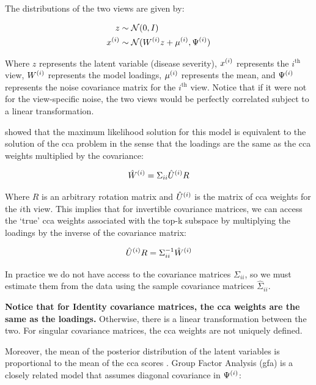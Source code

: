 The distributions of the two views are given by:

\begin{align}
    z& \sim \mathcal{N}(0, I)\\
    x^{(i)} & \sim \mathcal{N}(W^{(i)} z + \mu^{(i)}, \Psi^{(i)})
\end{align}

Where \(z\) represents the latent variable (disease severity), \(x^{(i)}\) represents the $i^{\text{th}}$ view, \(W^{(i)}\) represents the model loadings, \(\mu^{(i)}\) represents the mean, and \(\Psi^{(i)}\) represents the noise covariance matrix for the $i^{\text{th}}$ view.
Notice that if it were not for the view-specific noise, the two views would be perfectly correlated subject to a linear transformation.

\citet{bach2005probabilistic} showed that the maximum likelihood solution for this model is equivalent to the solution of the \acrshort{cca} problem in the sense that the \gls{loadings} are the same as the \acrshort{cca} weights multiplied by the covariance:

\begin{align}
    \label{eq:probabilistic-cca}
    \hat{W}^{(i)} = \Sigma_{ii} \hat{U}^{(i)} R
\end{align}

Where $R$ is an arbitrary rotation matrix and $\hat{U}^{(i)}$ is the matrix of \acrshort{cca} weights for the $i$th view.
This implies that for invertible covariance matrices, we can access the `true' \acrshort{cca} weights associated with the top-k subspace by multiplying the \gls{loadings} by the inverse of the covariance matrix:

\begin{align}
    \hat{U}^{(i)}R = \Sigma_{ii}^{-1} \hat{W}^{(i)}
\end{align}

In practice we do not have access to the covariance matrices $\Sigma_{ii}$, so we must estimate them from the data using the sample covariance matrices $\hat{\Sigma}_{ii}$.

\textbf{Notice that for Identity covariance matrices, the \acrshort{cca} weights are the same as the loadings.}
Otherwise, there is a linear transformation between the two.
For singular covariance matrices, the \acrshort{cca} weights are not uniquely defined.

Moreover, the mean of the posterior distribution of the latent variables is proportional to the mean of the \acrshort{cca} scores \citep{klami2013bayesian}.
Group Factor Analysis (\acrshort{gfa}) is a closely related model that assumes diagonal covariance in $\Psi^{(i)}$:

